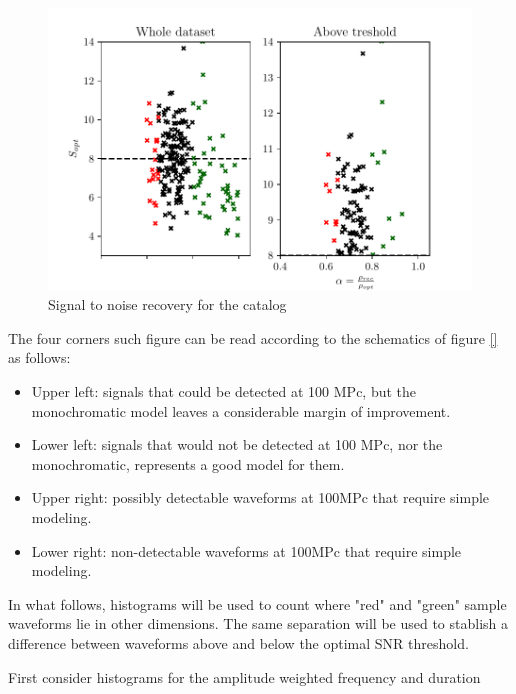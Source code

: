 \begin{figure}[hbt!]
\begin{center}
\includegraphics[width=\textwidth, angle=0]{images/Data_analysis/results/alpha_scatter.pdf}
\caption{Signal to noise recovery for the catalog}
\label{ascatter}
\end{center}
\end{figure}

\FloatBarrier


The four corners such figure can be read according to the schematics of figure \ref{} as follows:

\begin{itemize}
\item Upper left: signals that could be detected at 100 MPc, but the monochromatic model leaves a considerable margin of improvement.
\item Lower left: signals that would not be detected at 100 MPc, nor the monochromatic, represents a good model for them.
\item 
Upper right: possibly detectable waveforms at 100MPc that require simple modeling.
\item 
Lower right: non-detectable waveforms at 100MPc that require simple modeling.
\end{itemize}

\newpage

In what follows, histograms will be used to count where   "red" and "green" sample waveforms lie in other dimensions. The same separation will be used to stablish a difference between waveforms above and below the optimal SNR threshold.

First consider histograms for the amplitude weighted frequency and duration

